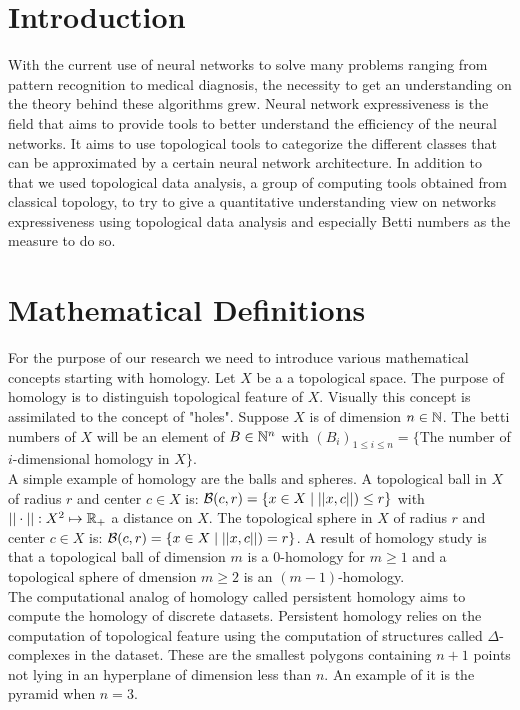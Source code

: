 \documentclass[12pt, a4paper]{article}
\begin{document}
\begin{multicols}{2}
  \section{Introduction}
With the current use of neural networks to solve many problems ranging from pattern recognition to medical diagnosis, the necessity to get an understanding on the theory behind these algorithms grew. Neural network expressiveness is the field that aims to provide tools to better understand the efficiency of the neural networks. It aims to use topological tools to categorize the different classes that can be approximated by a certain neural network architecture. In addition to that we used topological data analysis, a group of computing tools obtained from classical topology, to try to give a quantitative understanding view on networks expressiveness using topological data analysis and especially Betti numbers as the measure to do so.

\section{Mathematical Definitions}

For the purpose of our research we need to introduce various mathematical concepts starting with homology.  Let $X$ be a a topological space. The purpose of homology is to distinguish topological feature of $X$. Visually this concept is assimilated to the concept of "holes". Suppose $X$ is of dimension $n \in \mathbb{N}$. The betti numbers of $X$ will be an element of $B \in \mathbb{N}^n$ with $(B_i)_{1 \le i \le n} = \{$The number of $i$-dimensional homology in $X \}$.\\

A simple example of homology are the balls and spheres. A topological ball in $X$ of radius $r$ and center $c \in X$ is: $\mathcal{B}(c,r) = \{x \in X \mid ||x,c||) \le r\}$ with $||\cdot|| : X^2 \mapsto \mathbb{R}_+$ a distance on $X$. The topological sphere in $X$ of radius $r$ and center $c \in X$ is: $\mathcal{B}(c,r) = \{x \in X \mid ||x,c||) = r\}$. A result of homology study is that a topological ball of dimension $m$ is a 0-homology for $m \ge 1$ and a topological sphere of dmension $m \ge 2$ is an $(m - 1)$-homology.\\

The computational analog of homology called persistent homology aims to compute the homology of discrete datasets. Persistent homology relies on the computation of topological feature using the computation of structures called $\Delta$-complexes in the dataset. These are the smallest polygons containing $n+1$ points not lying in an hyperplane of dimension less than $n$. An example of it is the pyramid when $n = 3$.\\


\end{multicols}
\end{document}
